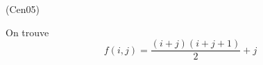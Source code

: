 \begin{tiny}(Cen05)\end{tiny} On trouve 
\begin{displaymath}
 f(i,j) = \frac{(i+j)(i+j+1)}{2} + j
\end{displaymath}
